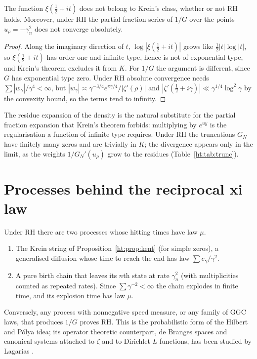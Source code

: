 \begin{proposition}\label{ht:prop:krein}
The function $\xi(\frac12+it)$ does not belong to Krein's class, whether or not RH holds. Moreover, under RH the partial fraction series of $1/G$ over the points $u_\rho=-\gamma_n^2$ does not converge absolutely.
\end{proposition}

\begin{proof}
Along the imaginary direction of $t$, $\log|\xi(\tfrac12+it)|$ grows like $\tfrac12|t|\log|t|$, so $\xi(\tfrac12+it)$ has order one and infinite type, hence is not of exponential type, and Krein's theorem excludes it from $K$. For $1/G$ the argument is different, since $G$ has exponential type zero. Under RH absolute convergence needs $\sum|w_\gamma|/\gamma^4<\infty$, but $|w_\gamma|\asymp\gamma^{-3/4}e^{\pi\gamma/4}/|\zeta'(\rho)|$ and $|\zeta'(\tfrac12+i\gamma)|\ll\gamma^{1/4}\log^2\gamma$ by the convexity bound, so the terms tend to infinity.
\end{proof}

The residue expansion of the density is the natural substitute for the partial fraction expansion that Krein's theorem forbids: multiplying by $e^{uy}$ is the regularisation a function of infinite type requires. Under RH the truncations $G_N$ have finitely many zeros and are trivially in $K$; the divergence appears only in the limit, as the weights $1/G_N'(u_\rho)$ grow to the residues (Table~\ref{ht:tab:trunc}). %

\section{Processes behind the reciprocal xi law}\label{ht:sec:processes}

Under RH there are two processes whose hitting times have law $\mu$.
\begin{enumerate}
\item The Krein string of Proposition~\ref{ht:prop:kent} (for simple zeros), a generalised diffusion whose time to reach the end has law $\sum e_\gamma/\gamma^2$.
\item A pure birth chain that leaves its $n$th state at rate $\gamma_n^2$ (with multiplicities counted as repeated rates). Since $\sum\gamma^{-2}<\infty$ the chain explodes in finite time, and its explosion time has law $\mu$.
\end{enumerate}
Conversely, any process with nonnegative speed measure, or any family of GGC laws, that produces $1/G$ proves RH. This is the probabilistic form of the Hilbert and P\'olya idea; its operator theoretic counterpart, de Branges spaces and canonical systems attached to $\zeta$ and to Dirichlet $L$ functions, has been studied by Lagarias \cite{Lagarias06}.

